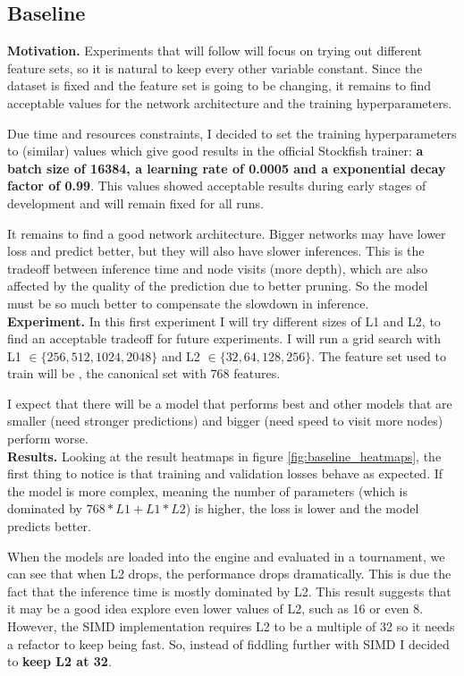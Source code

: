 \subsection{Baseline}

\textbf{Motivation.} Experiments that will follow will focus on trying out different feature sets, so it is natural to keep every other variable constant. Since the dataset is fixed and the feature set is going to be changing, it remains to find acceptable values for the network architecture and the training hyperparameters. 

Due time and resources constraints, I decided to set the training hyperparameters to   (similar) values which give good results in the official Stockfish trainer: \textbf{a batch size of 16384, a learning rate of 0.0005 and a exponential decay factor of 0.99}. This values showed acceptable results during early stages of development and will remain fixed for all runs.

It remains to find a good network architecture. Bigger networks may have lower loss and predict better, but they will also have slower inferences. This is the tradeoff between inference time and node visits (more depth), which are also affected by the quality of the prediction due to better pruning. So the model must be so much better to compensate the slowdown in inference. \\

\textbf{Experiment.}  In this first experiment I will try different sizes of L1 and L2,  to find an acceptable tradeoff for future experiments. I will run a grid search with L1 $\in \{256, 512, 1024, 2048\}$ and L2 $\in \{32, 64, 128, 256\}$. The feature set used to train will be , the canonical set with 768 features.

I expect that there will be a model that performs best and other models that are smaller (need stronger predictions) and bigger (need speed to visit more nodes) perform worse. \\

\textbf{Results.} Looking at the result heatmaps in figure \ref{fig:baseline_heatmaps}, the first thing to notice is that training and validation losses behave as expected. If the model is more complex, meaning the number of parameters (which is dominated by $768*L1+L1*L2$) is higher, the loss is lower and the model predicts better.

When the models are loaded into the engine and evaluated in a tournament, we can see that when L2 drops, the performance drops dramatically. This is due the fact that the inference time is mostly dominated by L2. This result suggests that it may be a good idea explore even lower values of L2, such as 16 or even 8. However, the SIMD implementation requires L2 to be a multiple of 32 so it needs a refactor to keep being fast. So, instead of fiddling further with SIMD I decided to \textbf{keep L2 at 32}.

